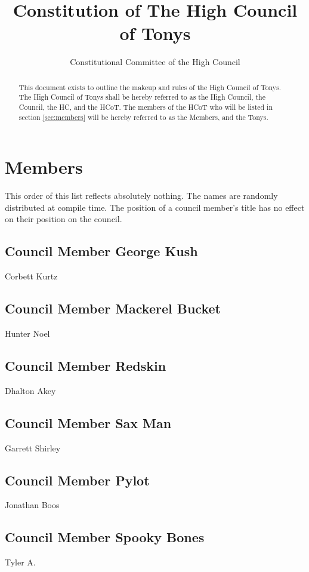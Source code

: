 \documentclass[]{article}
\title{Constitution of The High Council of Tonys}
\author{Constitutional Committee of the High Council}
\begin{document}
	
\maketitle



\begin{abstract}
	This document exists to outline the makeup and rules of the High Council of Tonys. The High Council of Tonys shall be hereby referred to as the High Council, the Council, the HC, and the HCoT. The members of the HCoT who will be listed in section \ref{sec:members} will be hereby referred to as the Members, and the Tonys.
\end{abstract}

\newpage
\tableofcontents

\newpage
\section{Members}
\label{sec:members}
	This order of this list reflects absolutely nothing. The names are randomly distributed at compile time. The position of a council member's title has no effect on their position on the council.
	\subsection{Council Member George Kush}
	\label{subsec:corbett}
		Corbett Kurtz
	\subsection{Council Member Mackerel Bucket}
	\label{subsec:hunter}
		Hunter Noel
	\subsection{Council Member Redskin}
	\label{subsec:dhalton}
		Dhalton Akey
	\subsection{Council Member Sax Man}
	\label{subsec:garrett}
		Garrett Shirley
	\subsection{Council Member Pylot}
	\label{subsec:jon}
		Jonathan Boos
	\subsection{Council Member Spooky Bones}
	\label{subsec:tyler}
		Tyler A.
\end{document}
